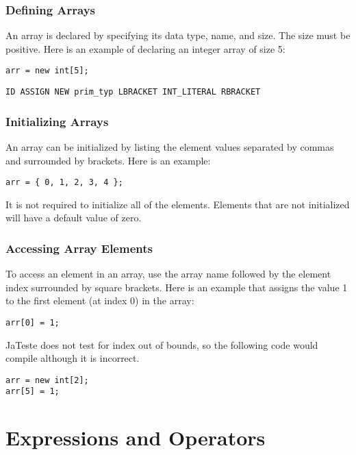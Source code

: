 \documentclass{article}
\begin{document}
\subsubsection{Defining Arrays}
An array is declared by specifying its data type, name, and size. The size must be positive. Here is an example of declaring an integer array of size 5:

 \begin{lstlisting}
arr = new int[5];
\end{lstlisting}

\begin{Verbatim}[frame=single]
ID ASSIGN NEW prim_typ LBRACKET INT_LITERAL RBRACKET
\end{Verbatim}

\subsubsection{Initializing Arrays}
An array can be initialized by listing the element values separated by commas and surrounded by brackets. Here is an example:

 \begin{lstlisting}
arr = { 0, 1, 2, 3, 4 };
\end{lstlisting}

It is not required to initialize all of the elements. Elements that are not initialized will have a default value of zero.

\subsubsection{Accessing Array Elements}
To access an element in an array, use the array name followed by the element index surrounded by square brackets. Here is an example that assigns the value 1 to the first element (at index 0) in the array:

 \begin{lstlisting}
arr[0] = 1;
\end{lstlisting}

JaTeste does not test for index out of bounds, so the following code would compile although it is incorrect. 

 \begin{lstlisting}
arr = new int[2];
arr[5] = 1;
\end{lstlisting}

\section{Expressions and Operators}
\end{document}
